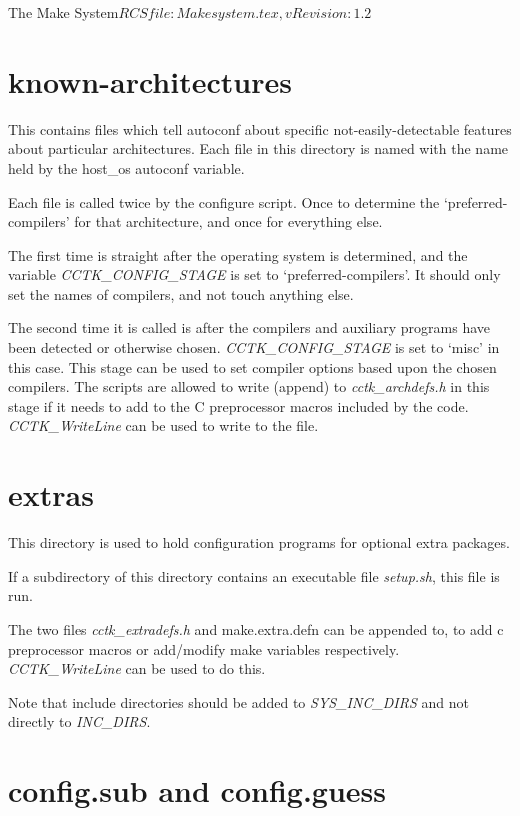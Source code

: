 \begin{cactuspart}{3}{The Make System}{$RCSfile: Makesystem.tex,v $}{$Revision: 1.2 $}
\section{known-architectures}
\label{sec:autoconf:knownarch}

This contains files which tell autoconf about specific not-easily-detectable
features about particular architectures.  Each file in this directory is
named with the name held by the host\_os autoconf variable.

Each file is called twice by the configure script.  Once to determine
the `preferred-compilers' for that architecture, and once for
everything else.

The first time is straight after the operating system is 
determined, and the variable {\em CCTK\_CONFIG\_STAGE} is set to
`preferred-compilers'.  It should only set the names of compilers,
and not touch anything else.  

The second time it is called is after the compilers and
auxiliary programs have been detected or otherwise chosen. 
{\em CCTK\_CONFIG\_STAGE} is set to `misc' in this case.  This stage
can be used to set compiler options based upon the chosen compilers.
The scripts are allowed to write (append) to {\em cctk\_archdefs.h} in
this stage if it needs to add to the C preprocessor macros included
by the code.  {\em CCTK\_WriteLine} can be used to write to the
file.

\section{extras}
\label{sec:autoconf:extras}

This directory is used to hold configuration programs for optional
extra packages.

If a subdirectory of this directory contains an executable file 
{\em setup.sh}, this file is run.

The two files {\em cctk\_extradefs.h} and {make.extra.defn} can be appended
to, to add c preprocessor macros or add/modify make variables respectively.
{\em CCTK\_WriteLine} can be used to do this.  

Note that include directories should be added to {\em SYS\_INC\_DIRS} and not
directly to {\em INC\_DIRS}.

\section{config.sub and config.guess}
\label{sec:autoconf:subguess}


\end{cactuspart}
